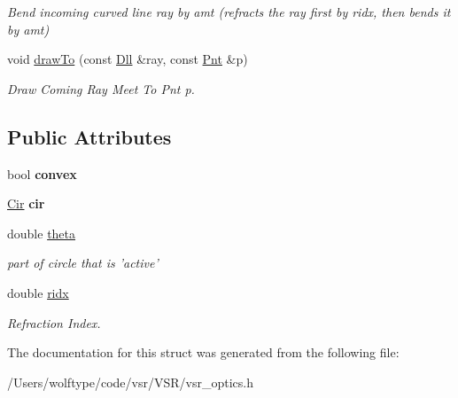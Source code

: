 \begin{DoxyCompactItemize}
\begin{DoxyCompactList}\small\item\em Bend incoming curved line ray by amt (refracts the ray first by ridx, then bends it by amt) \end{DoxyCompactList}\item 
\hypertarget{structvsr_1_1_optical_surface_a30e09f7b4992b73ce037273b1942c2bd}{void \hyperlink{structvsr_1_1_optical_surface_a30e09f7b4992b73ce037273b1942c2bd}{draw\-To} (const \hyperlink{namespacevsr_a6c6892b7aec25cfb16492501e2e35b11}{Dll} \&ray, const \hyperlink{namespacevsr_a2d05beb9721c5d9211b479af6d47222d}{Pnt} \&p)}\label{structvsr_1_1_optical_surface_a30e09f7b4992b73ce037273b1942c2bd}

\begin{DoxyCompactList}\small\item\em Draw Coming Ray Meet To Pnt p. \end{DoxyCompactList}\end{DoxyCompactItemize}
\subsection*{Public Attributes}
\begin{DoxyCompactItemize}
\item 
\hypertarget{structvsr_1_1_optical_surface_a4c8f67908eb4a0fb694c3977ad4d99d9}{bool {\bfseries convex}}\label{structvsr_1_1_optical_surface_a4c8f67908eb4a0fb694c3977ad4d99d9}

\item 
\hypertarget{structvsr_1_1_optical_surface_a0a7ef0672344671b2291e44df5570438}{\hyperlink{namespacevsr_a2744605aa828e495fc85463b7ae0d045}{Cir} {\bfseries cir}}\label{structvsr_1_1_optical_surface_a0a7ef0672344671b2291e44df5570438}

\item 
\hypertarget{structvsr_1_1_optical_surface_a94dd0e3fd6e597cbdaef050f795d0cb8}{double \hyperlink{structvsr_1_1_optical_surface_a94dd0e3fd6e597cbdaef050f795d0cb8}{theta}}\label{structvsr_1_1_optical_surface_a94dd0e3fd6e597cbdaef050f795d0cb8}

\begin{DoxyCompactList}\small\item\em part of circle that is 'active' \end{DoxyCompactList}\item 
\hypertarget{structvsr_1_1_optical_surface_a6d342a3f76e961a1c2a1964200445b9c}{double \hyperlink{structvsr_1_1_optical_surface_a6d342a3f76e961a1c2a1964200445b9c}{ridx}}\label{structvsr_1_1_optical_surface_a6d342a3f76e961a1c2a1964200445b9c}

\begin{DoxyCompactList}\small\item\em Refraction Index. \end{DoxyCompactList}\end{DoxyCompactItemize}


The documentation for this struct was generated from the following file\-:\begin{DoxyCompactItemize}
\item 
/\-Users/wolftype/code/vsr/\-V\-S\-R/vsr\-\_\-optics.\-h\end{DoxyCompactItemize}
